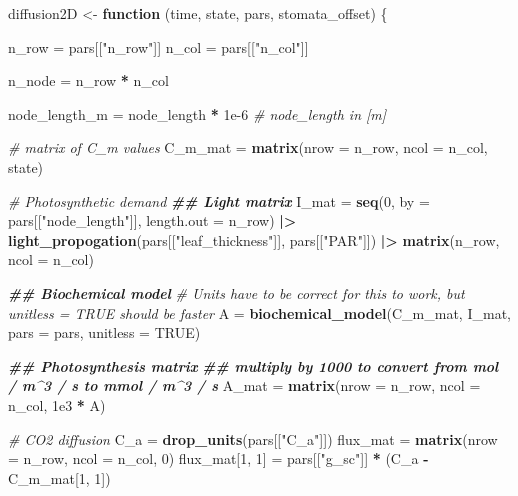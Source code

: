 \documentclass[12pt,halfline,a4paper,]{ouparticle}
\newenvironment{Shaded}{\begin{snugshade}}{\end{snugshade}}
\newcommand{\AttributeTok}[1]{\textcolor[rgb]{0.13,0.29,0.53}{#1}}
\newcommand{\CommentTok}[1]{\textcolor[rgb]{0.56,0.35,0.01}{\textit{#1}}}
\newcommand{\ConstantTok}[1]{\textcolor[rgb]{0.56,0.35,0.01}{#1}}
\newcommand{\ControlFlowTok}[1]{\textcolor[rgb]{0.13,0.29,0.53}{\textbf{#1}}}
\newcommand{\DecValTok}[1]{\textcolor[rgb]{0.00,0.00,0.81}{#1}}
\newcommand{\DocumentationTok}[1]{\textcolor[rgb]{0.56,0.35,0.01}{\textbf{\textit{#1}}}}
\newcommand{\FloatTok}[1]{\textcolor[rgb]{0.00,0.00,0.81}{#1}}
\newcommand{\FunctionTok}[1]{\textcolor[rgb]{0.13,0.29,0.53}{\textbf{#1}}}
\newcommand{\NormalTok}[1]{#1}
\newcommand{\OtherTok}[1]{\textcolor[rgb]{0.56,0.35,0.01}{#1}}
\newcommand{\SpecialCharTok}[1]{\textcolor[rgb]{0.81,0.36,0.00}{\textbf{#1}}}
\newcommand{\StringTok}[1]{\textcolor[rgb]{0.31,0.60,0.02}{#1}}
\begin{document}
\begin{Shaded}
\begin{Highlighting}[]
\NormalTok{diffusion2D }\OtherTok{\textless{}{-}} \ControlFlowTok{function}\NormalTok{ (time, state, pars, stomata\_offset) \{}

\NormalTok{  n\_row }\OtherTok{=}\NormalTok{ pars[[}\StringTok{"n\_row"}\NormalTok{]]}
\NormalTok{  n\_col }\OtherTok{=}\NormalTok{ pars[[}\StringTok{"n\_col"}\NormalTok{]]}

\NormalTok{  n\_node }\OtherTok{=}\NormalTok{ n\_row }\SpecialCharTok{*}\NormalTok{ n\_col}

\NormalTok{  node\_length\_m }\OtherTok{=}\NormalTok{ node\_length }\SpecialCharTok{*} \FloatTok{1e{-}6} \CommentTok{\# node\_length in [m]}

  \CommentTok{\# matrix of C\_m values}
\NormalTok{  C\_m\_mat }\OtherTok{=} \FunctionTok{matrix}\NormalTok{(}\AttributeTok{nrow =}\NormalTok{ n\_row, }\AttributeTok{ncol =}\NormalTok{ n\_col, state)}

  \CommentTok{\# Photosynthetic demand}
  \DocumentationTok{\#\# Light matrix}
\NormalTok{  I\_mat }\OtherTok{=} \FunctionTok{seq}\NormalTok{(}\DecValTok{0}\NormalTok{, }\AttributeTok{by =}\NormalTok{ pars[[}\StringTok{"node\_length"}\NormalTok{]], }\AttributeTok{length.out =}\NormalTok{ n\_row) }\SpecialCharTok{|\textgreater{}}
    \FunctionTok{light\_propogation}\NormalTok{(pars[[}\StringTok{"leaf\_thickness"}\NormalTok{]], pars[[}\StringTok{"PAR"}\NormalTok{]]) }\SpecialCharTok{|\textgreater{}}
    \FunctionTok{matrix}\NormalTok{(n\_row, }\AttributeTok{ncol =}\NormalTok{ n\_col)}

  \DocumentationTok{\#\# Biochemical model}
  \CommentTok{\# Units have to be correct for this to work, but unitless = TRUE should be faster}
\NormalTok{  A }\OtherTok{=} \FunctionTok{biochemical\_model}\NormalTok{(C\_m\_mat, I\_mat, }\AttributeTok{pars =}\NormalTok{ pars, }\AttributeTok{unitless =} \ConstantTok{TRUE}\NormalTok{)}

  \DocumentationTok{\#\# Photosynthesis matrix}
  \DocumentationTok{\#\# multiply by 1000 to convert from mol / m\^{}3 / s to mmol / m\^{}3 / s}
\NormalTok{  A\_mat }\OtherTok{=} \FunctionTok{matrix}\NormalTok{(}\AttributeTok{nrow =}\NormalTok{ n\_row, }\AttributeTok{ncol =}\NormalTok{ n\_col, }\FloatTok{1e3} \SpecialCharTok{*}\NormalTok{ A)}

  \CommentTok{\# CO2 diffusion}
\NormalTok{  C\_a }\OtherTok{=} \FunctionTok{drop\_units}\NormalTok{(pars[[}\StringTok{"C\_a"}\NormalTok{]])}
\NormalTok{  flux\_mat }\OtherTok{=} \FunctionTok{matrix}\NormalTok{(}\AttributeTok{nrow =}\NormalTok{ n\_row, }\AttributeTok{ncol =}\NormalTok{ n\_col, }\DecValTok{0}\NormalTok{)}
\NormalTok{  flux\_mat[}\DecValTok{1}\NormalTok{, }\DecValTok{1}\NormalTok{] }\OtherTok{=}\NormalTok{ pars[[}\StringTok{"g\_sc"}\NormalTok{]] }\SpecialCharTok{*}\NormalTok{ (C\_a }\SpecialCharTok{{-}}\NormalTok{ C\_m\_mat[}\DecValTok{1}\NormalTok{, }\DecValTok{1}\NormalTok{])}


\end{Highlighting}
\end{Shaded}
\end{document}
